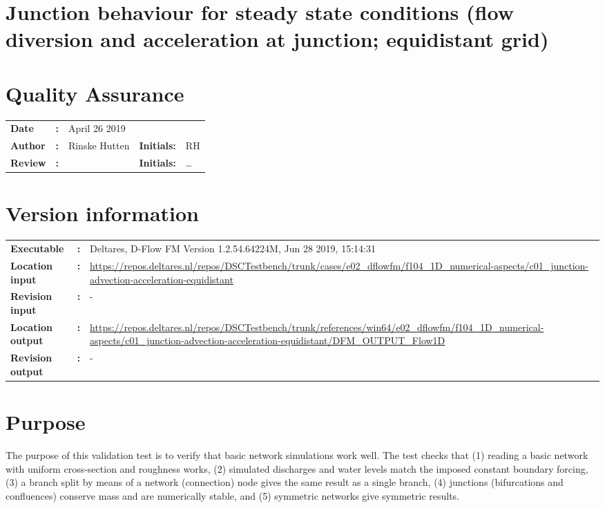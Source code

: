 

\section{Junction behaviour for steady state conditions (flow diversion and acceleration at junction; equidistant grid)}
\newrefsegment

\section*{Quality Assurance}
\begin{tabular}{@{}p{27mm}@{}p{0mm}p{\textwidth-52mm-48pt}p{15mm}p{10mm}}
\textbf{Date} & \textbf{:} & April 26 2019   \\ 
\textbf{Author} & \textbf{:} & Rinske Hutten  & \textbf{Initials:} & RH \\
\textbf{Review} & \textbf{:} &   & \textbf{Initials:} & \ldots 
\end{tabular}

\section*{Version information}
{{
\begin{tabular}{@{}p{27mm}@{}p{0mm}p{\textwidth-27mm-24pt}}
\textbf{Executable}   & \textbf{:} & Deltares, D-Flow FM Version 1.2.54.64224M, Jun 28 2019, 15:14:31 \\
\textbf{Location input}     & \textbf{:} & \url{https://repos.deltares.nl/repos/DSCTestbench/trunk/cases/e02_dflowfm/f104_1D_numerical-aspects/c01_junction-advection-acceleration-equidistant} \\
\textbf{Revision input} & \textbf{:} & - \\
\textbf{Location output}     & \textbf{:} & \url{https://repos.deltares.nl/repos/DSCTestbench/trunk/references/win64/e02_dflowfm/f104_1D_numerical-aspects/c01_junction-advection-acceleration-equidistant/DFM_OUTPUT_Flow1D} \\
\textbf{Revision output} & \textbf{:} & -
\end{tabular}
}}

\section*{Purpose}
The purpose of this validation test is to verify that basic network simulations work well.
The test checks that (1) reading a basic network with uniform cross-section and roughness works, (2) simulated discharges and water levels match the imposed constant boundary forcing, (3) a branch split by means of a network (connection) node gives the same result as a single branch, (4) junctions (bifurcations and confluences) conserve mass and are numerically stable, and (5) symmetric networks give symmetric results.

